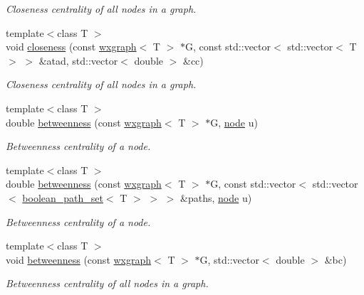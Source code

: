 \begin{DoxyCompactItemize}
\begin{DoxyCompactList}\small\item\em Closeness centrality of all nodes in a graph. \end{DoxyCompactList}\item 
{\footnotesize template$<$class T $>$ }\\void \hyperlink{namespacelgraph_1_1networks_1_1metrics_1_1centralities_a05e8a2bf5c57440c5a1aced933ea13bf}{closeness} (const \hyperlink{classlgraph_1_1wxgraph}{wxgraph}$<$ T $>$ $\ast$G, const std\-::vector$<$ std\-::vector$<$ T $>$ $>$ \&atad, std\-::vector$<$ double $>$ \&cc)
\begin{DoxyCompactList}\small\item\em Closeness centrality of all nodes in a graph. \end{DoxyCompactList}\item 
{\footnotesize template$<$class T $>$ }\\double \hyperlink{namespacelgraph_1_1networks_1_1metrics_1_1centralities_a5a8a94d9361a49ffa657d8d6541be4be}{betweenness} (const \hyperlink{classlgraph_1_1wxgraph}{wxgraph}$<$ T $>$ $\ast$G, \hyperlink{namespacelgraph_a397169dd66adf725210a30fb7251773e}{node} u)
\begin{DoxyCompactList}\small\item\em Betweenness centrality of a node. \end{DoxyCompactList}\item 
{\footnotesize template$<$class T $>$ }\\double \hyperlink{namespacelgraph_1_1networks_1_1metrics_1_1centralities_a22d289500772bb1c1c40f705f8cfcdf0}{betweenness} (const \hyperlink{classlgraph_1_1wxgraph}{wxgraph}$<$ T $>$ $\ast$G, const std\-::vector$<$ std\-::vector$<$ \hyperlink{namespacelgraph_afad432931ba600ab1628d5c9595986c5}{boolean\-\_\-path\-\_\-set}$<$ T $>$ $>$ $>$ \&paths, \hyperlink{namespacelgraph_a397169dd66adf725210a30fb7251773e}{node} u)
\begin{DoxyCompactList}\small\item\em Betweenness centrality of a node. \end{DoxyCompactList}\item 
{\footnotesize template$<$class T $>$ }\\void \hyperlink{namespacelgraph_1_1networks_1_1metrics_1_1centralities_adbfe6a6a80259a6c75c63ca60813b0f8}{betweenness} (const \hyperlink{classlgraph_1_1wxgraph}{wxgraph}$<$ T $>$ $\ast$G, std\-::vector$<$ double $>$ \&bc)
\begin{DoxyCompactList}\small\item\em Betweenness centrality of all nodes in a graph. \end{DoxyCompactList}\item 

\end{DoxyCompactItemize}
